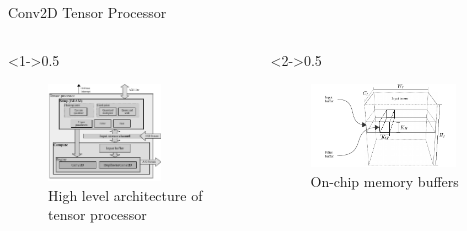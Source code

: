 \begin{frame}{Conv2D Tensor Processor}
	\begin{columns}[c] %
		
		\begin{column}<1->{0.5\textwidth}
			\begin{figure}
				\includegraphics[width=0.7\textwidth]{../chapters/cnn_accelerator/figures/accelerator.pdf} %
				\caption{High level architecture of tensor processor}
			\end{figure}
		\end{column}
		
		\begin{column}<2->{0.5\textwidth}
			\begin{figure}
				\includegraphics[width=0.9\textwidth]{../chapters/cnn_accelerator/figures/accelerator_buffers.pdf} %
				\caption{ On-chip memory buffers}
			\end{figure}
		\end{column}
		
	\end{columns}
\end{frame}

